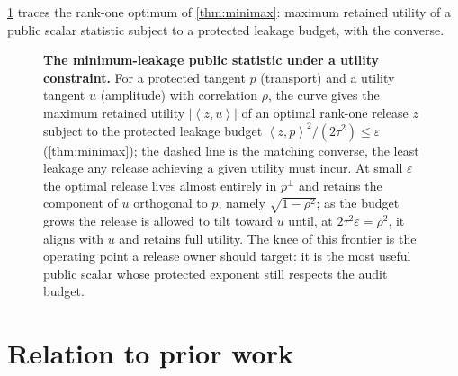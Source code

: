 \documentclass[11pt]{article}
\newcommand{\eps}{\varepsilon}
\newcommand{\inner}[2]{\left\langle #1,#2\right\rangle}
\begin{document}
\cref{fig:release} traces the rank-one optimum of \cref{thm:minimax}: maximum retained utility of a public scalar statistic subject to a protected leakage budget, with the converse.

\begin{figure}[htbp]
\centering
\centering
{}

\caption{\textbf{The minimum-leakage public statistic under a utility constraint.} For a protected tangent \(p\) (transport) and a utility tangent \(u\) (amplitude) with correlation \(\rho\), the curve gives the maximum retained utility \(|\inner{z}{u}|\) of an optimal rank-one release \(z\) subject to the protected leakage budget \(\inner{z}{p}^2/(2\tau^2)\le\eps\) (\cref{thm:minimax}); the dashed line is the matching converse, the least leakage any release achieving a given utility must incur. At small \(\eps\) the optimal release lives almost entirely in \(p^\perp\) and retains the component of \(u\) orthogonal to \(p\), namely \(\sqrt{1-\rho^2}\); as the budget grows the release is allowed to tilt toward \(u\) until, at \(2\tau^2\eps=\rho^2\), it aligns with \(u\) and retains full utility. The knee of this frontier is the operating point a release owner should target: it is the most useful public scalar whose protected exponent still respects the audit budget.}
\label{fig:release}
\end{figure}

\section{Relation to prior work}
\end{document}
